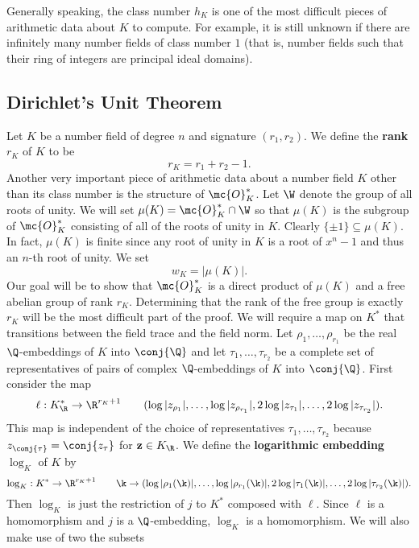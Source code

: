       Generally speaking, the class number $h_{K}$ is one of the most difficult pieces of arithmetic data about $K$ to compute. For example, it is still unknown if there are infinitely many number fields of class number $1$ (that is, number fields such that their ring of integers are principal ideal domains).
    \subsection*{Dirichlet's Unit Theorem}
      Let $K$ be a number field of degree $n$ and signature $(r_{1},r_{2})$. We define the \textbf{rank} $r_{K}$ of $K$ to be
      \[
        r_{K} = r_{1}+r_{2}-1.
      \]
      Another very important piece of arithmetic data about a number field $K$ other than its class number is the structure of $\mc{O}_{K}^{\ast}$. Let $\W$ denote the group of all roots of unity. We will set $\mu(K) = \mc{O}_{K}^{\ast} \cap \W$ so that $\mu(K)$ is the subgroup of $\mc{O}_{K}^{\ast}$ consisting of all of the roots of unity in $K$. Clearly $\{\pm 1\} \subseteq \mu(K)$. In fact, $\mu(K)$ is finite since any root of unity in $K$ is a root of $x^{n}-1$ and thus an $n$-th root of unity. We set
      \[
        w_{K} = |\mu(K)|.
      \]
      Our goal will be to show that $\mc{O}_{K}^{\ast}$ is a direct product of $\mu(K)$ and a free abelian group of rank $r_{K}$. Determining that the rank of the free group is exactly $r_{K}$ will be the most difficult part of the proof. We will require a map on $K^{\ast}$ that transitions between the field trace and the field norm. Let $\rho_{1},\ldots,\rho_{r_{1}}$ be the real $\Q$-embeddings of $K$ into $\conj{\Q}$ and let $\tau_{1},\ldots,\tau_{r_{2}}$ be a complete set of representatives of pairs of complex $\Q$-embeddings of $K$ into $\conj{\Q}$. First consider the map
      \[
        \ell:K_{\R}^{\ast} \to \R^{r_{K}+1} \qquad (\log|z_{\rho_{1}}|,\ldots,\log|z_{\rho_{r_{1}}}|,2\log|z_{\tau_{1}}|,\ldots,2\log|z_{\tau_{r_{2}}}|).
      \]
      This map is independent of the choice of representatives $\tau_{1},\ldots,\tau_{r_{2}}$ because $z_{\conj{\tau}} = \conj{z_{\tau}}$ for $\mathbf{z} \in K_{\R}$.
      We define the \textbf{logarithmic embedding} $\log_{K}$ of $K$ by
      \[
        \log_{K}:K^{\ast} \to \R^{r_{K}+1} \qquad \k \to (\log|\rho_{1}(\k)|,\ldots,\log|\rho_{r_{1}}(\k)|,2\log|\tau_{1}(\k)|,\ldots,2\log|\tau_{r_{2}}(\k)|).
      \]
      Then $\log_{K}$ is just the restriction of $j$ to $K^{\ast}$ composed with $\ell$. Since $\ell$ is a homomorphism and $j$ is a $\Q$-embedding, $\log_{K}$ is a homomorphism. We will also make use of two the subsets

